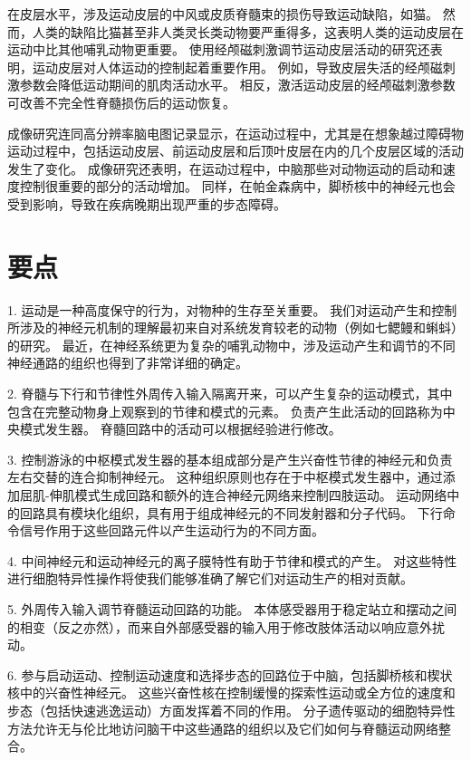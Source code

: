 在皮层水平，涉及运动皮层的中风或皮质脊髓束的损伤导致运动缺陷，如猫。
然而，人类的缺陷比猫甚至非人类灵长类动物要严重得多，这表明人类的运动皮层在运动中比其他哺乳动物更重要。
使用经颅磁刺激调节运动皮层活动的研究还表明，运动皮层对人体运动的控制起着重要作用。
例如，导致皮层失活的经颅磁刺激参数会降低运动期间的肌肉活动水平。
相反，激活运动皮层的经颅磁刺激参数可改善不完全性脊髓损伤后的运动恢复。


成像研究连同高分辨率脑电图记录显示，在运动过程中，尤其是在想象越过障碍物运动过程中，包括运动皮层、前运动皮层和后顶叶皮层在内的几个皮层区域的活动发生了变化。
成像研究还表明，在运动过程中，中脑那些对动物运动的启动和速度控制很重要的部分的活动增加。
同样，在帕金森病中，脚桥核中的神经元也会受到影响，导致在疾病晚期出现严重的步态障碍。



\section{要点}

1. 运动是一种高度保守的行为，对物种的生存至关重要。
我们对运动产生和控制所涉及的神经元机制的理解最初来自对系统发育较老的动物（例如七鳃鳗和蝌蚪）的研究。
最近，在神经系统更为复杂的哺乳动物中，涉及运动产生和调节的不同神经通路的组织也得到了非常详细的确定。 


2. 脊髓与下行和节律性外周传入输入隔离开来，可以产生复杂的运动模式，其中包含在完整动物身上观察到的节律和模式的元素。
负责产生此活动的回路称为中央模式发生器。 
脊髓回路中的活动可以根据经验进行修改。


3. 控制游泳的中枢模式发生器的基本组成部分是产生兴奋性节律的神经元和负责左右交替的连合抑制神经元。
这种组织原则也存在于中枢模式发生器中，通过添加屈肌-伸肌模式生成回路和额外的连合神经元网络来控制四肢运动。
运动网络中的回路具有模块化组织，具有用于组成神经元的不同发射器和分子代码。
下行命令信号作用于这些回路元件以产生运动行为的不同方面。


4. 中间神经元和运动神经元的离子膜特性有助于节律和模式的产生。
对这些特性进行细胞特异性操作将使我们能够准确了解它们对运动生产的相对贡献。


5. 外周传入输入调节脊髓运动回路的功能。
本体感受器用于稳定站立和摆动之间的相变（反之亦然），而来自外部感受器的输入用于修改肢体活动以响应意外扰动。 


6. 参与启动运动、控制运动速度和选择步态的回路位于中脑，包括脚桥核和楔状核中的兴奋性神经元。
这些兴奋性核在控制缓慢的探索性运动或全方位的速度和步态（包括快速逃逸运动）方面发挥着不同的作用。
分子遗传驱动的细胞特异性方法允许无与伦比地访问脑干中这些通路的组织以及它们如何与脊髓运动网络整合。


